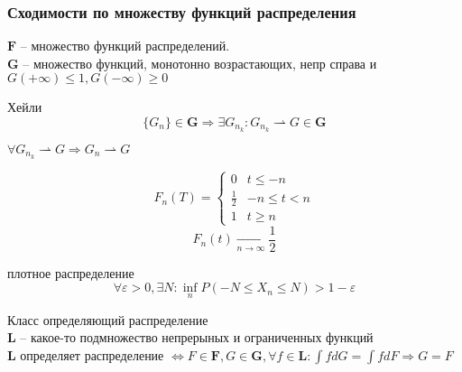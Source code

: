 \documentclass{article}
\begin{document}
    \subsubsection{Сходимости по множеству функций распределения}
    \begin{definition}
        $\mathbf{F}$ -- множество функций распределений. \\
        $\mathbf{G}$ -- множество функций, монотонно возрастающих, непр справа и $G(+\infty) \le 1, G(-\infty) \ge 0$\\
    \end{definition}
    \begin{theorem}{Хейли}
        $$\{G_n\} \in \mathbf{G} \Rightarrow \exists G_{n_k}: G_{n_k} \rightharpoonup G\in \mathbf{G}$$
    \end{theorem}
    \begin{corollary}
        $\forall G_{n_k} \rightharpoonup G \Rightarrow G_n \rightharpoonup G$
    \end{corollary}
    \begin{example}
        $$ F_n(T) = \begin{cases}
            0 & t \le -n\\
            \frac{1}{2} & -n \le t < n \\
            1 & t \ge n
        \end{cases}$$
        $$ F_n(t) \underset{n\to\infty}{\longrightarrow} \frac{1}{2}$$
    \end{example}
    \begin{definition}{плотное распределение}
        $$
        \forall \varepsilon > 0, \exists N:  \inf_n P(-N \le X_n \le N) > 1 - \varepsilon 
        $$
    \end{definition}
    \begin{definition}{Класс определяющий распределение}\\
        $\mathbf{L}$ -- какое-то подмножество непрерыных и ограниченных функций\\
        $\mathbf{L}$ определяет распределение $\Leftrightarrow F\in\mathbf{F}, G\in\mathbf{G}, \forall f\in \mathbf{L}: \int fdG = \int fdF \Rightarrow G=F $
    \end{definition}
\end{document}
